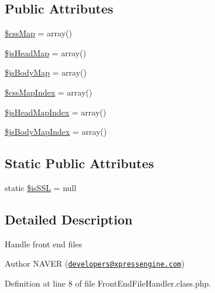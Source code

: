 \subsection*{Public Attributes}
\begin{DoxyCompactItemize}
\item 
\hyperlink{classFrontEndFileHandler_ae7470e6b48cdd0b76b8bd0fd8e38850c}{\$css\-Map} = array()
\item 
\hyperlink{classFrontEndFileHandler_ab434f9c8c874aaf8186e259dff95d116}{\$js\-Head\-Map} = array()
\item 
\hyperlink{classFrontEndFileHandler_ad03de614a088bc386c393543a3cd9aed}{\$js\-Body\-Map} = array()
\item 
\hyperlink{classFrontEndFileHandler_a61df1d725cd1884fd0a260dec738a4b7}{\$css\-Map\-Index} = array()
\item 
\hyperlink{classFrontEndFileHandler_a151a55b31ffaec411a86b7f618eed4ac}{\$js\-Head\-Map\-Index} = array()
\item 
\hyperlink{classFrontEndFileHandler_aba61415d3f993f1f6b9cddc0024f50b1}{\$js\-Body\-Map\-Index} = array()
\end{DoxyCompactItemize}
\subsection*{Static Public Attributes}
\begin{DoxyCompactItemize}
\item 
static \hyperlink{classFrontEndFileHandler_a1e709934ab4023d10850268064d771bc}{\$is\-S\-S\-L} = null
\end{DoxyCompactItemize}


\subsection{Detailed Description}
Handle front end files \begin{DoxyAuthor}{Author}
N\-A\-V\-E\-R (\href{mailto:developers@xpressengine.com}{\tt developers@xpressengine.\-com}) 
\end{DoxyAuthor}


Definition at line 8 of file Front\-End\-File\-Handler.\-class.\-php.



